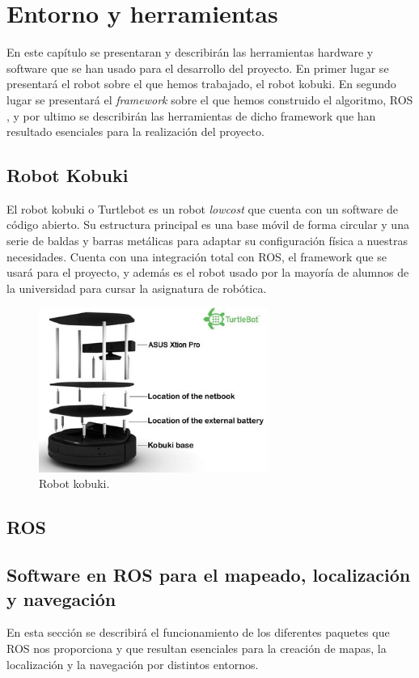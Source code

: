 \chapter{Entorno y herramientas}
\label{cap:entorno}
En este capítulo se presentaran y describirán las herramientas hardware y software que se han usado para el desarrollo del proyecto. En primer lugar se presentará el robot sobre el que hemos trabajado, el robot kobuki. En segundo lugar se presentará el \textit{framework} sobre el que hemos construido el algoritmo, ROS , y por ultimo se describirán las herramientas de dicho framework que han resultado esenciales para la realización del proyecto.


\section{Robot Kobuki}
\label{cap:robot}
El robot kobuki o Turtlebot es un robot \textit{lowcost} que cuenta con un software de código abierto. Su estructura principal es una base móvil de forma circular y una serie de baldas y barras metálicas para adaptar su configuración física a nuestras necesidades. Cuenta con una integración total con ROS, el framework que se usará para el proyecto, y además es el robot usado por la mayoría de alumnos de la universidad para cursar la asignatura de robótica.
\begin{figure} [H]
  \begin{center}
    \includegraphics[width=7.5cm]{img/cap3/kobuki}
  \end{center}
  \caption{Robot kobuki.}
  \label{fig:kobuki}
\end{figure}


\section{ROS}
\label{cap:ros}


\section{Software en ROS para el mapeado, localización y navegación}
\label{cap:softwarederos}
En esta sección se describirá el funcionamiento de los diferentes paquetes que ROS nos proporciona y que resultan esenciales para la creación de mapas, la localización y la navegación por distintos entornos.

